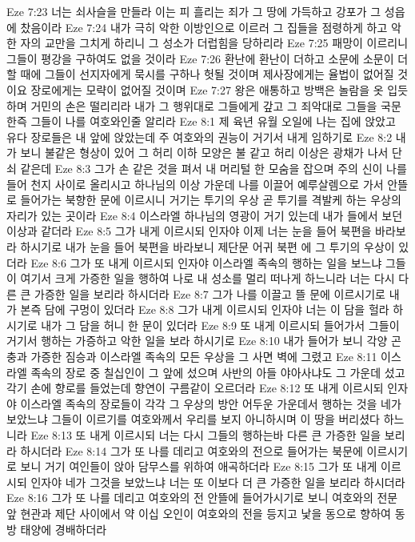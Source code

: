 Eze 7:23  너는 쇠사슬을 만들라 이는 피 흘리는 죄가 그 땅에 가득하고 강포가 그 성읍에 찼음이라
Eze 7:24  내가 극히 악한 이방인으로 이르러 그 집들을 점령하게 하고 악한 자의 교만을 그치게 하리니 그 성소가 더럽힘을 당하리라
Eze 7:25  패망이 이르리니 그들이 평강을 구하여도 없을 것이라
Eze 7:26  환난에 환난이 더하고 소문에 소문이 더할 때에 그들이 선지자에게 묵시를 구하나 헛될 것이며 제사장에게는 율법이 없어질 것이요 장로에게는 모략이 없어질 것이며
Eze 7:27  왕은 애통하고 방백은 놀람을 옷 입듯하며 거민의 손은 떨리리라 내가 그 행위대로 그들에게 갚고 그 죄악대로 그들을 국문한즉 그들이 나를 여호와인줄 알리라
Eze 8:1  제 육년 유월 오일에 나는 집에 앉았고 유다 장로들은 내 앞에 앉았는데 주 여호와의 권능이 거기서 내게 임하기로
Eze 8:2  내가 보니 불같은 형상이 있어 그 허리 이하 모양은 불 같고 허리 이상은 광채가 나서 단 쇠 같은데
Eze 8:3  그가 손 같은 것을 펴서 내 머리털 한 모숨을 잡으며 주의 신이 나를 들어 천지 사이로 올리시고 하나님의 이상 가운데 나를 이끌어 예루살렘으로 가서 안뜰로 들어가는 북향한 문에 이르시니 거기는 투기의 우상 곧 투기를 격발케 하는 우상의 자리가 있는 곳이라
Eze 8:4  이스라엘 하나님의 영광이 거기 있는데 내가 들에서 보던 이상과 같더라
Eze 8:5  그가 내게 이르시되 인자야 이제 너는 눈을 들어 북편을 바라보라 하시기로 내가 눈을 들어 북편을 바라보니 제단문 어귀 북편 에 그 투기의 우상이 있더라
Eze 8:6  그가 또 내게 이르시되 인자야 이스라엘 족속의 행하는 일을 보느냐 그들이 여기서 크게 가증한 일을 행하여 나로 내 성소를 멀리 떠나게 하느니라 너는 다시 다른 큰 가증한 일을 보리라 하시더라
Eze 8:7  그가 나를 이끌고 뜰 문에 이르시기로 내가 본즉 담에 구멍이 있더라
Eze 8:8  그가 내게 이르시되 인자야 너는 이 담을 헐라 하시기로 내가 그 담을 허니 한 문이 있더라
Eze 8:9  또 내게 이르시되 들어가서 그들이 거기서 행하는 가증하고 악한 일을 보라 하시기로
Eze 8:10  내가 들어가 보니 각양 곤충과 가증한 짐승과 이스라엘 족속의 모든 우상을 그 사면 벽에 그렸고
Eze 8:11  이스라엘 족속의 장로 중 칠십인이 그 앞에 섰으며 사반의 아들 야아사냐도 그 가운데 섰고 각기 손에 향로를 들었는데 향연이 구름같이 오르더라
Eze 8:12  또 내게 이르시되 인자야 이스라엘 족속의 장로들이 각각 그 우상의 방안 어두운 가운데서 행하는 것을 네가 보았느냐 그들이 이르기를 여호와께서 우리를 보지 아니하시며 이 땅을 버리셨다 하느니라
Eze 8:13  또 내게 이르시되 너는 다시 그들의 행하는바 다른 큰 가증한 일을 보리라 하시더라
Eze 8:14  그가 또 나를 데리고 여호와의 전으로 들어가는 북문에 이르시기로 보니 거기 여인들이 앉아 담무스를 위하여 애곡하더라
Eze 8:15  그가 또 내게 이르시되 인자야 네가 그것을 보았느냐 너는 또 이보다 더 큰 가증한 일을 보리라 하시더라
Eze 8:16  그가 또 나를 데리고 여호와의 전 안뜰에 들어가시기로 보니 여호와의 전문 앞 현관과 제단 사이에서 약 이십 오인이 여호와의 전을 등지고 낯을 동으로 향하여 동방 태양에 경배하더라
